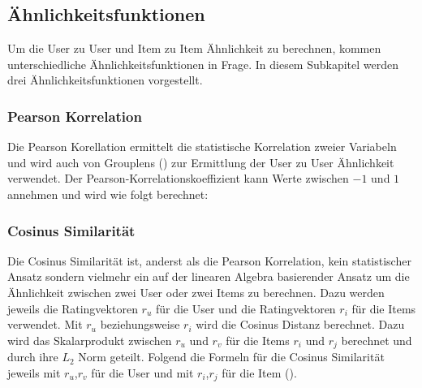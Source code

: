 \subsection{Ähnlichkeitsfunktionen}
Um die User zu User und Item zu Item Ähnlichkeit zu berechnen, kommen unterschiedliche Ähnlichkeitsfunktionen in Frage. In diesem Subkapitel werden drei Ähnlichkeitsfunktionen vorgestellt.

\subsubsection{Pearson Korrelation}
Die Pearson Korellation ermittelt die statistische Korrelation zweier Variabeln und wird auch von Grouplens (\cite{Resnick94grouplens:an}) zur Ermittlung der User zu User Ähnlichkeit verwendet. Der Pearson-Korrelationskoeffizient kann Werte zwischen $-1$ und $1$ annehmen und wird wie folgt berechnet:




\subsubsection{Cosinus Similarität}

Die Cosinus Similarität ist, anderst als die Pearson Korrelation, kein statistischer Ansatz sondern vielmehr ein auf der linearen Algebra basierender Ansatz um die Ähnlichkeit zwischen zwei User oder zwei Items zu berechnen. Dazu werden jeweils die Ratingvektoren $r_u$ für die User und die Ratingvektoren $r_i$ für die Items verwendet.
Mit $r_u$ beziehungsweise $r_i$ wird die Cosinus Distanz berechnet. Dazu wird das Skalarprodukt zwischen $r_u$ und $r_v$ für die Items $r_i$ und $r_j$ berechnet und durch ihre $L_2$ Norm geteilt.
Folgend die Formeln für die Cosinus Similarität jeweils mit $r_u$,$r_v$ für die User und mit $r_i$,$r_j$ für die Item (\cite{Ekstrand2011}).


